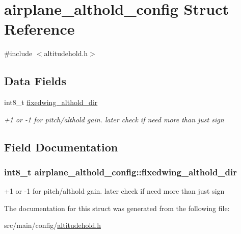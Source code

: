 \hypertarget{structairplane__althold__config}{\section{airplane\+\_\+althold\+\_\+config Struct Reference}
\label{structairplane__althold__config}
}


{\ttfamily \#include $<$altitudehold.\+h$>$}

\subsection*{Data Fields}
\begin{DoxyCompactItemize}
\item 
int8\+\_\+t \hyperlink{structairplane__althold__config_a8ffa5bf1268a38b0967c78a28a12a3cc}{fixedwing\+\_\+althold\+\_\+dir}
\begin{DoxyCompactList}\small\item\em +1 or -\/1 for pitch/althold gain. later check if need more than just sign \end{DoxyCompactList}\end{DoxyCompactItemize}


\subsection{Field Documentation}
\hypertarget{structairplane__althold__config_a8ffa5bf1268a38b0967c78a28a12a3cc}{
\subsubsection[{fixedwing\+\_\+althold\+\_\+dir}]{\setlength{\rightskip}{0pt plus 5cm}int8\+\_\+t airplane\+\_\+althold\+\_\+config\+::fixedwing\+\_\+althold\+\_\+dir}}\label{structairplane__althold__config_a8ffa5bf1268a38b0967c78a28a12a3cc}


+1 or -\/1 for pitch/althold gain. later check if need more than just sign 



The documentation for this struct was generated from the following file\+:\begin{DoxyCompactItemize}
\item 
src/main/config/\hyperlink{config_2altitudehold_8h}{altitudehold.\+h}\end{DoxyCompactItemize}
